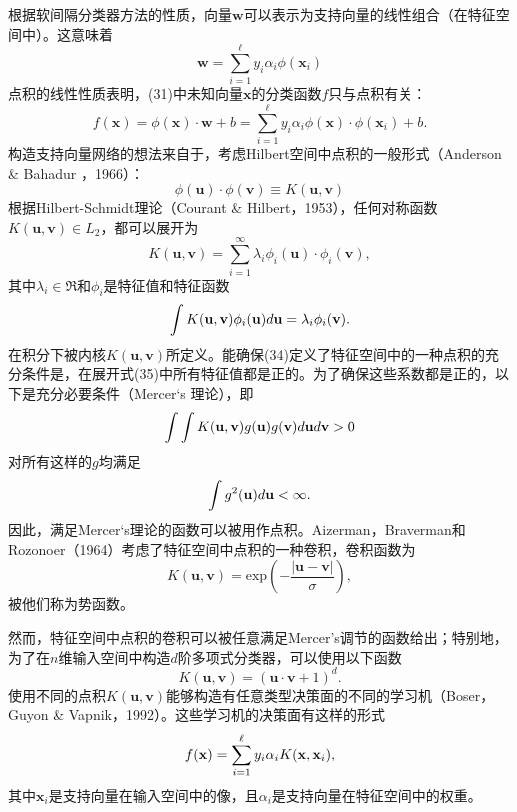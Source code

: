 \documentclass[lang=cn,11pt,a4paper]{elegantpaper}
\begin{document}
	根据软间隔分类器方法的性质，向量$\mathbf{w}$可以表示为支持向量的线性组合（在特征空间中）。这意味着
	\begin{equation}
		\mathbf{w}=\sum_{i=1}^{\ell}y_i\alpha_i\phi(\mathbf{x}_i)\tag{32}
	\end{equation}
	点积的线性性质表明，(31)中未知向量$\mathbf{x}$的分类函数$f$只与点积有关：
	\begin{equation}
		f(\mathbf{x})=\phi(\mathbf{x})·\mathbf{w}+b=\sum_{i=1}^{\ell}y_i\alpha_i\phi(\mathbf{x})·\phi(\mathbf{x}_i)+b.\tag{33}
	\end{equation}
	构造支持向量网络的想法来自于，考虑Hilbert空间中点积的一般形式（Anderson \& Bahadur ，1966）：
	\begin{equation}
		\phi(\mathbf{u})·\phi(\mathbf{v})\equiv K(\mathbf{u},\mathbf{v})\tag{34}
	\end{equation}
	根据Hilbert-Schmidt理论（Courant \& Hilbert，1953），任何对称函数$K(\mathbf{u},\mathbf{v})\in L_2$，都可以展开为
	\begin{equation}
		K(\mathbf{u},\mathbf{v})=\sum_{i=1}^\infty\lambda_i\phi_i(\mathbf{u})·\phi_i(\mathbf{v}),\tag{35}
	\end{equation}
	其中$\lambda_i\in\mathfrak{R}$和$\phi_i$是特征值和特征函数
	\begin{equation}
		\int K(\mathbf{u},\mathbf{v}) \phi_i(\mathbf{u})d\mathbf{u} = \lambda_i \phi_i(\mathbf{v}). \notag
	\end{equation}
	在积分下被内核$K(\mathbf{u},\mathbf{v})$所定义。能确保(34)定义了特征空间中的一种点积的充分条件是，在展开式(35)中所有特征值都是正的。为了确保这些系数都是正的，以下是充分必要条件（Mercer‘s 理论），即
	\begin{equation}
		\int \int K(\mathbf{u},\mathbf{v})g(\mathbf{u})g(\mathbf{v})d\mathbf{u}d\mathbf{v}>0 \notag
	\end{equation}
	对所有这样的$g$均满足
	\begin{equation}
		\int g^2(\mathbf{u})d\mathbf{u}<\infty.\notag
	\end{equation}
	因此，满足Mercer‘s理论的函数可以被用作点积。Aizerman，Braverman和Rozonoer（1964）考虑了特征空间中点积的一种卷积，卷积函数为
	\begin{equation}
		K(\mathbf{u},\mathbf{v})=\mathrm{exp}\left(-\frac{|\mathbf{u}-\mathbf{v}|}{\sigma}\right),\tag{36}
	\end{equation}
	被他们称为势函数。

	然而，特征空间中点积的卷积可以被任意满足Mercer’s调节的函数给出；特别地，为了在$n$维输入空间中构造$d$阶多项式分类器，可以使用以下函数
	\begin{equation}
		K(\mathbf{u},\mathbf{v})=(\mathbf{u}·\mathbf{v}+1)^d.\tag{37}
	\end{equation}
	使用不同的点积$K(\mathbf{u},\mathbf{v})$能够构造有任意类型决策面的不同的学习机（Boser，Guyon \& Vapnik，1992）。这些学习机的决策面有这样的形式
	\begin{equation}
		f(\mathbf{x})=\sum_{i=1}^{\ell}y_i\alpha_iK(\mathbf{x},\mathbf{x}_i),\notag
	\end{equation}
	其中$\mathbf{x}_i$是支持向量在输入空间中的像，且$\alpha_i$是支持向量在特征空间中的权重。
\end{document}
